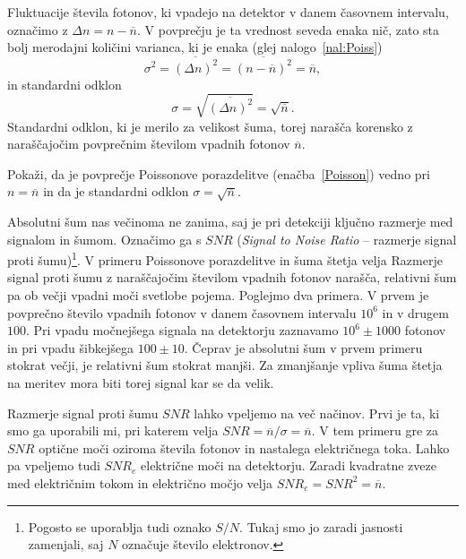 Fluktuacije števila fotonov, ki vpadejo na detektor v danem časovnem 
intervalu, označimo z $\Delta n = n-\overline{n}$. V povprečju je ta vrednost seveda enaka nič, 
zato sta bolj merodajni količini varianca, ki je enaka (glej nalogo~\ref{nal:Poiss})
\begin{equation}
\sigma^2 = \overline{(\Delta n)^2}= \overline{(n-\overline{n})^2} = \overline{n},
\label{varianca}
\end{equation}
in standardni odklon
\begin{equation}
\sigma = \sqrt{\overline{(\Delta n)^2}} = \sqrt{\overline{n}}.
\label{sigma}
\end{equation}
Standardni odklon, ki je merilo za velikost šuma, torej narašča korensko 
z naraščajočim povprečnim številom vpadnih fotonov $\overline{n}$. 
\begin{definition}
Pokaži, da je povprečje Poissonove porazdelitve (enačba~\ref{Poisson}) vedno pri $n = \overline{n}$
in da je standardni odklon $\sigma = \sqrt{\overline{n}}$.
\label{nal:Poiss}
\end{definition}

Absolutni šum nas večinoma ne zanima, 
saj je pri detekciji ključno razmerje med signalom in šumom. 
Označimo ga s $SNR$ ({\it Signal to Noise Ratio} --
razmerje 
signal proti šumu)\footnote{Pogosto se uporablja tudi oznako $S/N$. Tukaj smo jo 
zaradi jasnosti zamenjali, saj $N$ označuje število elektronov.}.
V primeru Poissonove porazdelitve in šuma štetja velja
Razmerje signal proti šumu z naraščajočim številom vpadnih fotonov narašča, 
relativni šum pa ob večji vpadni moči svetlobe pojema. 
Poglejmo dva primera. V prvem je povprečno število vpadnih 
fotonov v danem časovnem intervalu $10^6$ in v drugem $100$. 
Pri vpadu močnejšega signala 
na detektorju zaznavamo $10^6 \pm 1000$ fotonov in pri vpadu šibkejšega
$100 \pm 10$. Čeprav je absolutni šum v prvem primeru stokrat večji, 
je relativni šum stokrat manjši. Za zmanjšanje vpliva šuma štetja na meritev mora biti 
torej signal kar se da velik. 

\begin{remark}
Razmerje signal proti šumu $SNR$ lahko vpeljemo na več načinov. Prvi je ta, ki smo ga 
uporabili mi, pri katerem velja $SNR = \overline{n}/\sigma = \overline{n}$. V tem primeru
gre za $SNR$ optične moči oziroma števila fotonov in nastalega električnega toka. Lahko
pa vpeljemo tudi $SNR_e$ električne moči na detektorju.
Zaradi kvadratne zveze med električnim tokom in električno močjo velja 
$SNR_e=SNR^2={\overline{n}}$.
\end{remark}

